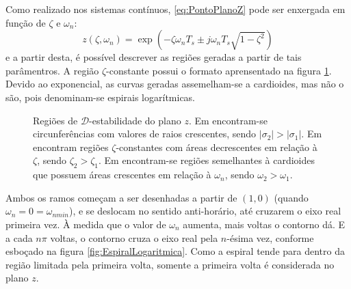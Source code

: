 Como realizado nos sistemas contínuos, \eqref{eq:PontoPlanoZ} pode ser enxergada em função de $\zeta$ e $\omega_n$:
\begin{equation}
  z(\zeta,\omega_n) = \exp{\left(-\zeta\omega_nT_s \pm j\omega_nT_s\sqrt{1-\zeta^2}\right)}\label{eq:FuncaoPontoZ}
\end{equation}
e a partir desta, é possível descrever as regiões geradas a partir de tais parâmentros. A região $\zeta$-constante possui o formato aprensentado na figura \ref{subfig:EstabilidadeRelativaZ}. Devido ao exponencial, as curvas geradas assemelham-se a cardioides, mas não o são, pois denominam-se espirais logarítmicas.
\begin{figure}[!ht]
  \centering
  \begin{subfigure}[t]{0.3\columnwidth}
      
      \caption{}
      \label{subfig:EstabilidadeRelativaZ}
  \end{subfigure}
  \begin{subfigure}[t]{0.3\columnwidth}
      
      \caption{}
      \label{subfig:TaxaDeAmortecimentoZ}
  \end{subfigure}
  \begin{subfigure}[t]{0.3\columnwidth}
    
    \caption{}
    \label{subfig:OscilacaoNaoAmortecidaZ}
  \end{subfigure}
  \caption{Regiões de $\mathscr{D}$-estabilidade do plano $z$. Em  encontram-se circunferências com valores de raios crescentes, sendo $|\sigma_2| > |\sigma_1|$. Em  encontram regiões $\zeta$-constantes com áreas decrescentes em relação à $\zeta$, sendo $\zeta_2 > \zeta_1$. Em  encontram-se regiões semelhantes à cardioides que possuem áreas crescentes em relação à $\omega_n$, sendo $\omega_2 > \omega_1$.}
  \label{fig:RegioesPlanoZ}
\end{figure}

Ambos os ramos começam a ser desenhadas a partir de $(1,0)$ (quando $\omega_n = 0 = \omega_{nmin}$), e se deslocam no sentido anti-horário, até cruzarem o eixo real primeira vez. À medida que o valor de $\omega_n$ aumenta, mais voltas o contorno dá. E a cada $n\pi$ voltas, o contorno cruza o eixo real pela $n$-ésima vez, conforme esboçado na figura \ref{fig:EspiralLogaritmica}. Como a espiral tende para dentro da região limitada pela primeira volta, somente a primeira volta é considerada no plano $z$.

